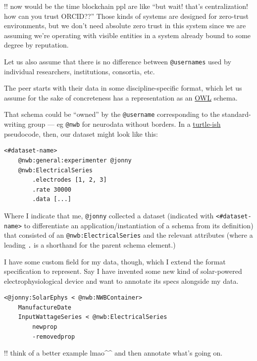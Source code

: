 \documentclass[11pt]{article}
\begin{document}
\begin{multicols}{2}
!! now would be the time blockchain ppl are like ``but wait! that's
centralization! how can you trust ORCID??'' Those kinds of systems are
designed for zero-trust environments, but we don't need absolute zero
trust in this system since we are assuming we're operating with visible
entities in a system already bound to some degree by reputation.

Let us also assume that there is no difference between
\texttt{@usernames} used by individual researchers, institutions,
consortia, etc.

The peer starts with their data in some discipline-specific format,
which let us assume for the sake of concreteness has a representation as
an \href{https://www.w3.org/OWL/}{OWL} schema.

That schema could be ``owned'' by the \texttt{@username} corresponding
to the standard-writing group --- eg \texttt{@nwb} for neurodata without
borders. In a \href{https://www.w3.org/TR/turtle/}{turtle-ish}
pseudocode, then, our dataset might look like this:

\begin{verbatim}
<#dataset-name>
    @nwb:general:experimenter @jonny
    @nwb:ElectricalSeries
        .electrodes [1, 2, 3]
        .rate 30000
        .data [...]
\end{verbatim}

Where I indicate that me, \texttt{@jonny} collected a dataset (indicated
with \texttt{\textless{}\#dataset-name\textgreater{}} to differentiate
an application/instantiation of a schema from its definition) that
consisted of an \texttt{@nwb:ElectricalSeries} and the relevant
attributes (where a leading \texttt{.} is a shorthand for the parent
schema element.)

I have some custom field for my data, though, which I extend the format
specification to represent. Say I have invented some new kind of
solar-powered electrophysiological device and want to annotate its specs
alongside my data.

\begin{verbatim}
<@jonny:SolarEphys < @nwb:NWBContainer>
    ManufactureDate
    InputWattageSeries < @nwb:ElectricalSeries
        newprop
        -removedprop
\end{verbatim}

!! think of a better example lmao\^{}\^{} and then annotate what's going
on.


\end{multicols}
\end{document}
